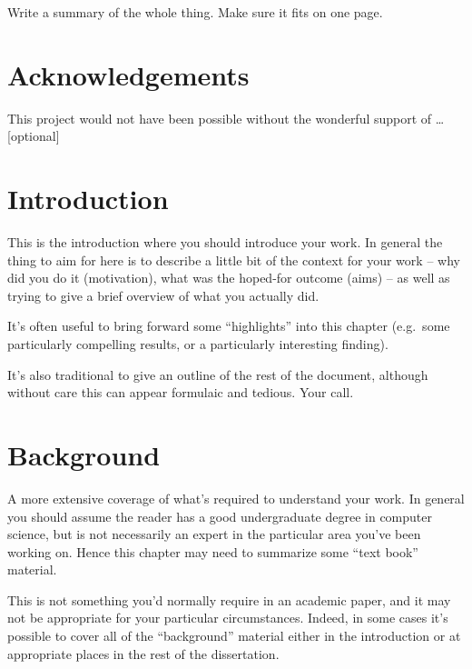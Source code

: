 \documentclass[12pt,a4paper,twoside]{report}
\newif\ifsubmission %
\begin{document}
Write a summary of the whole thing. Make sure it fits on one page.

\ifsubmission\else

\chapter*{Acknowledgements}

This project would not have been possible without the wonderful
support of \ldots [optional]

\fi
\cleardoublepage %

\tableofcontents

\chapter{Introduction}

\label{firstcontentpage} %

This is the introduction where you should introduce your work. In
general the thing to aim for here is to describe a little bit of the
context for your work -- why did you do it (motivation), what was the
hoped-for outcome (aims) -- as well as trying to give a brief overview
of what you actually did.

It's often useful to bring forward some ``highlights'' into this
chapter (e.g.\ some particularly compelling results, or a particularly
interesting finding).

It's also traditional to give an outline of the rest of the document,
although without care this can appear formulaic and tedious. Your
call.

\chapter{Background}

A more extensive coverage of what's required to understand your work.
In general you should assume the reader has a good undergraduate
degree in computer science, but is not necessarily an expert in the
particular area you've been working on. Hence this chapter may need to
summarize some ``text book'' material.

This is not something you'd normally require in an academic paper, and
it may not be appropriate for your particular circumstances. Indeed,
in some cases it's possible to cover all of the ``background''
material either in the introduction or at appropriate places in the
rest of the dissertation.
\end{document}
